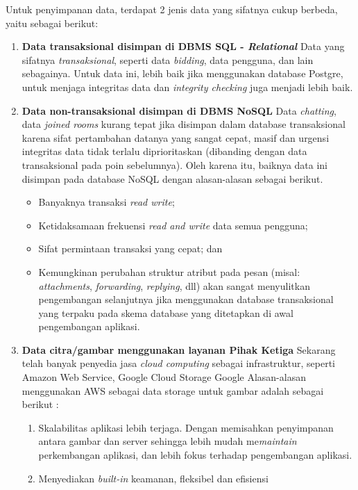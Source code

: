 	Untuk penyimpanan data, terdapat 2 jenis data yang sifatnya cukup berbeda, yaitu sebagai berikut:
	\begin{enumerate}
		\item \textbf{Data transaksional disimpan di DBMS SQL - \textit{Relational}}
		\newline
		\indent Data yang sifatnya \textit{transaksional}, seperti data \textit{bidding}, data pengguna, dan lain sebagainya.
		Untuk data ini, lebih baik jika menggunakan database Postgre, untuk menjaga integritas data dan \textit{integrity checking} juga  menjadi lebih baik.
		\item \textbf{Data non-transaksional disimpan di DBMS NoSQL}
		\newline
		\indent Data \textit{chatting}, data \textit{joined rooms} kurang tepat jika disimpan dalam database transaksional karena sifat pertambahan datanya yang sangat cepat, masif dan urgensi integritas data tidak terlalu diprioritaskan (dibanding dengan data transaksional pada poin sebelumnya). Oleh karena itu, baiknya data ini disimpan pada database NoSQL dengan alasan-alasan sebagai berikut.
		\begin{itemize} 
			\item Banyaknya transaksi \textit{read write};
			\item Ketidaksamaan frekuensi \textit{read and write} data semua pengguna;
			\item Sifat permintaan transaksi yang cepat; dan
			\item Kemungkinan perubahan struktur atribut pada pesan (misal: \textit{attachments}, \textit{forwarding}, \textit{replying}, dll) akan sangat menyulitkan pengembangan selanjutnya jika menggunakan database transaksional yang terpaku pada skema database yang ditetapkan di awal pengembangan aplikasi.
		\end{itemize} 	
		
		\item \textbf{Data citra/gambar menggunakan layanan Pihak Ketiga} \newline
		\indent Sekarang telah banyak penyedia jasa \textit{cloud computing} sebagai infrastruktur, seperti Amazon Web Service, Google Cloud Storage Google Alasan-alasan menggunakan AWS sebagai data storage untuk gambar adalah sebagai berikut :
		\begin{enumerate}[noitemsep,topsep=0pt]
			\item Skalabilitas aplikasi lebih terjaga. 
			\newline Dengan memisahkan penyimpanan antara gambar dan server sehingga lebih mudah me\textit{maintain} perkembangan aplikasi, dan lebih fokus terhadap pengembangan aplikasi.
			\item Menyediakan \textit{built-in} keamanan, fleksibel dan efisiensi \cite{wikipedia_amazon_2016}
		\end{enumerate}
		

\end{enumerate}
